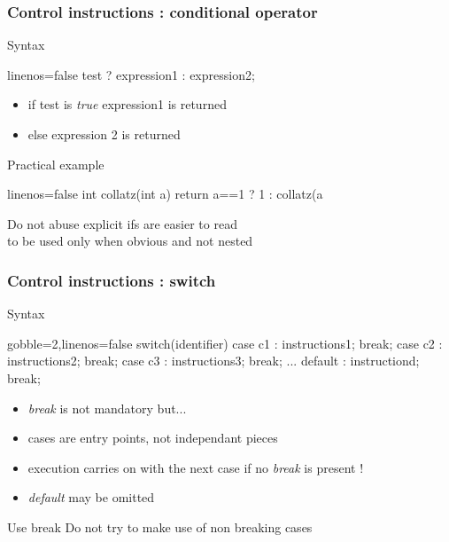 \begin{frame}[fragile]
  \frametitle{Control instructions : conditional operator}
  \begin{block}{Syntax}
    \begin{cppcode*}{linenos=false}
      test ? expression1 : expression2;
    \end{cppcode*}
    \vspace{-0.3cm}
    \begin{itemize}
      \item if test is {\it true} expression1 is returned
      \item else expression 2 is returned
    \end{itemize}
  \end{block}
  \pause
  \begin{exampleblock}{Practical example}
    \begin{cppcode*}{linenos=false}
      int collatz(int a) {
        return a==1 ? 1 : collatz(a%
      }
    \end{cppcode*}
  \end{exampleblock}
  \pause
  \begin{alertblock}{Do not abuse}
    explicit ifs are easier to read \\
    to be used only when obvious and not nested
  \end{alertblock}
\end{frame}

\begin{frame}[fragile]
  \frametitle{Control instructions : switch}
  \begin{block}{Syntax}
    \begin{cppcode*}{gobble=2,linenos=false}
      switch(identifier) {
        case c1 : instructions1; break;
        case c2 : instructions2; break;
        case c3 : instructions3; break;
        ...
        default : instructiond; break;
      }
    \end{cppcode*}
    \vspace{-0.5cm}
    \begin{itemize}
      \item {\it break} is not mandatory but...
      \item cases are entry points, not independant pieces
      \item execution carries on with the next case if no {\it break} is present !
      \item {\it default} may be omitted
    \end{itemize}
  \end{block}
  \pause
  \begin{alertblock}{Use break}
    Do not try to make use of non breaking cases
  \end{alertblock}
\end{frame}


